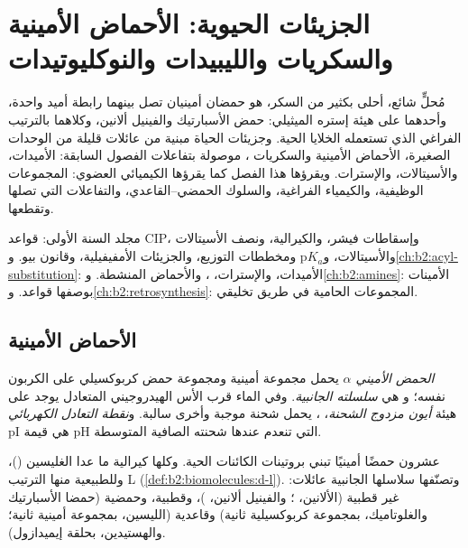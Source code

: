 \chapter{الجزيئات الحيوية: الأحماض الأمينية والسكريات والليبيدات والنوكليوتيدات}\label{ch:b2:biomolecules}

مُحلٍّ شائع، أحلى بكثير من السكر، هو حمضان أمينيان تصل بينهما رابطة أميد واحدة، وأحدهما
على هيئة إستره الميثيلي: حمض الأسبارتيك والفينيل ألانين، وكلاهما بالترتيب الفراغي الذي تستعمله
الخلايا الحية. وجزيئات الحياة مبنية من عائلات قليلة من الوحدات الصغيرة، الأحماض الأمينية والسكريات  ، موصولة بتفاعلات الفصول السابقة: الأميدات، والأسيتالات، والإسترات. ويقرؤها
هذا الفصل كما يقرؤها الكيميائي العضوي: المجموعات الوظيفية، والكيمياء الفراغية، والسلوك
الحمضي--القاعدي، والتفاعلات التي تصلها وتقطعها.

\begin{recall}
مجلد السنة الأولى: قواعد CIP، وإسقاطات فيشر، والكيرالية، ونصف الأسيتالات والأسيتالات، و$\mathrm pK_a$
ومخططات التوزيع، والجزيئات الأمفيفيلية، وقانون بيو. و\cref{ch:b2:acyl-substitution}: الأميدات،
والإسترات، ، والأحماض المنشطة. و\cref{ch:b2:amines}: الأمينات بوصفها قواعد.
و\cref{ch:b2:retrosynthesis}: المجموعات الحامية في طريق تخليقي.
\end{recall}

\section{الأحماض الأمينية}

\begin{definition}\label{def:b2:biomolecules:amino-acid}
\emph{الحمض الأميني $\alpha$}  يحمل
مجموعة أمينية ومجموعة حمض كربوكسيلي على الكربون نفسه؛ و هي \emph{سلسلته
الجانبية}. وفي الماء قرب الأس الهيدروجيني المتعادل يوجد على هيئة \emph{أيون مزدوج الشحنة}،
، يحمل شحنة موجبة وأخرى سالبة. و\emph{نقطة التعادل
الكهربائي} pI هي قيمة pH التي تنعدم عندها شحنته الصافية المتوسطة.
\end{definition}

عشرون حمضًا أمينيًا تبني بروتينات الكائنات الحية. وكلها كيرالية ما عدا الغليسين ()، 
وللطبيعية منها الترتيب L (\cref{def:b2:biomolecules:d-l}). وتصنّفها سلاسلها الجانبية
عائلات: غير قطبية (الألانين، ؛ والفينيل ألانين، )، وقطبية، وحمضية
(حمضا الأسبارتيك والغلوتاميك، بمجموعة كربوكسيلية ثانية) وقاعدية (الليسين، بمجموعة أمينية
ثانية؛ والهستيدين، بحلقة إيميدازول).

